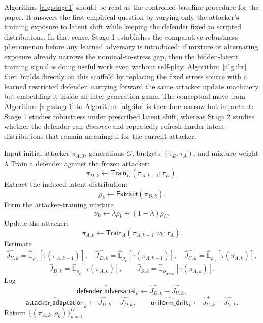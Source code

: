 \documentclass[11pt]{article}
\newcommand{\E}{\mathbb{E}}
\newcommand{\tauT}{\tau}
\newcommand{\rhoStress}{\rho_{\mathrm{stress}}}
\begin{document}
Algorithm~\ref{alg:stage1} should be read as the controlled baseline procedure for the paper. It answers the first empirical question by varying only the attacker's training exposure to latent shift while keeping the defender fixed to scripted distributions. In that sense, Stage 1 establishes the comparative robustness phenomenon before any learned adversary is introduced: if mixture or alternating exposure already narrows the nominal-to-stress gap, then the hidden-latent training signal is doing useful work even without self-play. Algorithm~\ref{alg:ibr} then builds directly on this scaffold by replacing the fixed stress source with a learned restricted defender, carrying forward the same attacker update machinery but embedding it inside an inter-generation game. The conceptual move from Algorithm~\ref{alg:stage1} to Algorithm~\ref{alg:ibr} is therefore narrow but important: Stage 1 studies robustness under prescribed latent shift, whereas Stage 2 studies whether the defender can \emph{discover} and repeatedly refresh harder latent distributions that remain meaningful for the current attacker.

\begin{algorithm}[H]
\caption{Restricted iterative best response}
\label{alg:ibr}
\begin{algorithmic}[1]
\STATE Input initial attacker $\pi_{A,0}$, generations $G$, budgets $(\tau_D,\tau_A)$, and mixture weight $\lambda$
    \STATE Train a defender against the frozen attacker:
    \[
    \pi_{D,k}\leftarrow \mathsf{Train}_{D}(\pi_{A,k-1};\tau_D).
    \]
    \STATE Extract the induced latent distribution:
    \[
    \rho_k\leftarrow \mathsf{Extract}(\pi_{D,k}).
    \]
    \STATE Form the attacker-training mixture
    \[
    \nu_k\leftarrow \lambda \rho_k + (1-\lambda)\rho_U.
    \]
    \STATE Update the attacker:
    \[
    \pi_{A,k}\leftarrow \mathsf{Train}_{A}(\pi_{A,k-1},\nu_k;\tau_A).
    \]
    \STATE Estimate
    \[
    \widehat{J}_{U,k}^{-}=\widehat{\E}_{\rho_U}[\tauT(\pi_{A,k-1})],\quad
    \widehat{J}_{D,k}^{-}=\widehat{\E}_{\rho_k}[\tauT(\pi_{A,k-1})],\quad
    \widehat{J}_{U,k}^{+}=\widehat{\E}_{\rho_U}[\tauT(\pi_{A,k})],
    \]
    \[
    \widehat{J}_{D,k}^{+}=\widehat{\E}_{\rho_k}[\tauT(\pi_{A,k})],
    \qquad
    \widehat{J}_{S,k}^{+}=\widehat{\E}_{\rhoStress}[\tauT(\pi_{A,k})].
    \]
    \STATE Log
    \[
    \widehat{\textsf{defender\_adversarial}}_k
    \leftarrow
    \widehat{J}_{D,k}^{-}-\widehat{J}_{U,k}^{-},
    \]
    \[
    \widehat{\textsf{attacker\_adaptation}}_k
    \leftarrow
    \widehat{J}_{D,k}^{+}-\widehat{J}_{D,k}^{-},
    \qquad
    \widehat{\textsf{uniform\_drift}}_k
    \leftarrow
    \widehat{J}_{U,k}^{+}-\widehat{J}_{U,k}^{-}.
    \]
\ENDFOR
\STATE Return $\{(\pi_{A,k},\rho_k)\}_{k=1}^{G}$
\end{algorithmic}
\end{algorithm}
\end{document}
